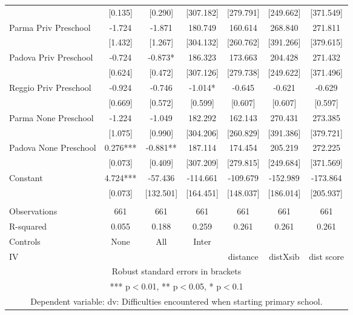 \begin{tabular}{lcccccc}
 & [0.135] & [0.290] & [307.182] & [279.791] & [249.662] & [371.549] \\
Parma Priv Preschool & -1.724 & -1.871 & 180.749 & 160.614 & 268.840 & 271.811 \\
 & [1.432] & [1.267] & [304.132] & [260.762] & [391.266] & [379.615] \\
Padova Priv Preschool & -0.724 & -0.873* & 186.323 & 173.663 & 204.428 & 271.432 \\
 & [0.624] & [0.472] & [307.126] & [279.738] & [249.622] & [371.496] \\
Reggio Priv Preschool & -0.924 & -0.746 & -1.014* & -0.645 & -0.621 & -0.629 \\
 & [0.669] & [0.572] & [0.599] & [0.607] & [0.607] & [0.597] \\
Parma None Preschool & -1.224 & -1.049 & 182.292 & 162.143 & 270.431 & 273.385 \\
 & [1.075] & [0.990] & [304.206] & [260.829] & [391.386] & [379.721] \\
Padova None Preschool & 0.276*** & -0.881** & 187.114 & 174.454 & 205.219 & 272.225 \\
 & [0.073] & [0.409] & [307.209] & [279.815] & [249.684] & [371.569] \\
Constant & 4.724*** & -57.436 & -114.661 & -109.679 & -152.989 & -173.864 \\
 & [0.073] & [132.501] & [164.451] & [148.037] & [186.014] & [205.937] \\
 &  &  &  &  &  &  \\
Observations & 661 & 661 & 661 & 661 & 661 & 661 \\
R-squared & 0.055 & 0.188 & 0.259 & 0.261 & 0.261 & 0.261 \\
Controls & None & All & Inter &  &  &  \\
 IV &  &  &  & distance & distXsib & dist score \\ \hline
\multicolumn{7}{c}{ Robust standard errors in brackets} \\
\multicolumn{7}{c}{ *** p$<$0.01, ** p$<$0.05, * p$<$0.1} \\
\multicolumn{7}{c}{ Dependent variable: dv: Difficulties encountered when starting primary school.} \\
\end{tabular}
